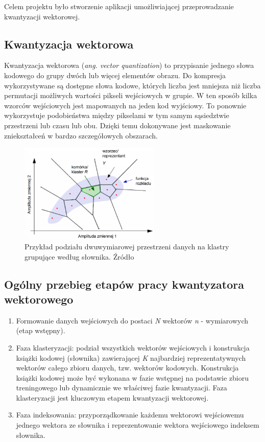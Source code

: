 \documentclass{article}
\begin{document}
Celem projektu było stworzenie aplikacji umożliwiającej przeprowadzanie kwantyzacji wektorowej.

\subsection{Kwantyzacja wektorowa}
Kwantyzacja wektorowa (\textit{ang. vector quantization}) to przypisanie jednego słowa kodowego do grupy dwóch lub więcej elementów obrazu. Do kompresja wykorzystywane są dostępne słowa kodowe, których liczba jest mniejsza niż liczba permutacji możliwych wartości pikseli wejściowych w grupie. W ten sposób kilka wzorców wejściowych jest mapowanych na jeden kod wyjściowy. To ponownie wykorzystuje podobieństwa między pikselami w tym samym sąsiedztwie przestrzeni lub czasu lub obu. Dzięki temu dokonywane jest maskowanie zniekształceń w bardzo szczegółowych obszarach.
\begin{figure}[H]
    \centering
    \includegraphics[width=0.6\textwidth]{images/kwantyzacja_wektorowa.png}
    \caption{Przykład podziału dwuwymiarowej przestrzeni danych na klastry grupujące według słownika. Źródło \cite{mwilczewski}}
    \label{fig:crossing}
\end{figure}

\subsection{Ogólny przebieg etapów pracy kwantyzatora wektorowego}

\begin{enumerate}
  \item Formowanie danych wejściowych do postaci \textit{N} wektorów \textit{n} - wymiarowych (etap wstępny). 
  \item Faza klasteryzacji: podział wszystkich wektorów wejściowych i konstrukcja książki kodowej (słownika) zawierającej \textit{K} najbardziej reprezentatywnych wektorów całego zbioru danych, tzw. wektorów kodowych. Konstrukcja książki kodowej może być wykonana w fazie wstępnej na podstawie zbioru treningowego lub dynamicznie we właściwej fazie kwantyzacji. Faza klasteryzacji jest kluczowym etapem kwantyzacji wektorowej.
  \item Faza indeksowania: przyporządkowanie każdemu wektorowi wejściowemu jednego wektora ze słownika i reprezentowanie wektora wejściowego indeksem słownika. 
\end{enumerate}
\end{document}
